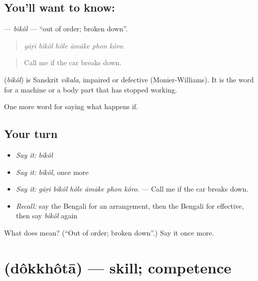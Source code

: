 \subsection*{You'll want to know: }
\textbf{} — \emph{bikôl} — \textquotedblleft{}out of order; broken down\textquotedblright{}.

\begin{quote}
     
\end{quote}

\begin{quote}
\emph{gāṛi bikôl hôle āmāke phon kôro.}
\end{quote}

\begin{quote}
Call me if the car breaks down.
\end{quote}

\begin{cousinweb}
\textbf{} (\emph{bikôl}) is Sanskrit \emph{vikala}, impaired or defective (Monier-Williams). It is the word for a machine or a body part that has stopped working.
\end{cousinweb}

\begin{grammarlens}[title={What you've built}]
One more word for saying what happens if.
\end{grammarlens}

\subsection*{Your turn}
\begin{itemize}
\raggedright
  \item \emph{Say it:} \emph{bikôl}
  \item \emph{Say it:} \emph{bikôl}, once more
  \item \emph{Say it:} \emph{gāṛi bikôl hôle āmāke phon kôro.} — Call me if the car breaks down.
  \item \emph{Recall:} say the Bengali for an arrangement, then the Bengali for effective, then say \emph{bikôl} again
\end{itemize}

\begin{tcolorbox}[breakable,colback=teal!4,colframe=teal!35!black,title={Before you move on}]
What does  mean? (\textquotedblleft{}Out of order; broken down\textquotedblright{}.) Say it once more.
\end{tcolorbox}
\section[\texorpdfstring{\bn{দক্ষতা} (dôkkhôtā)}{দক্ষতা (dôkkhôtā)}]{ (dôkkhôtā) — skill; competence}

